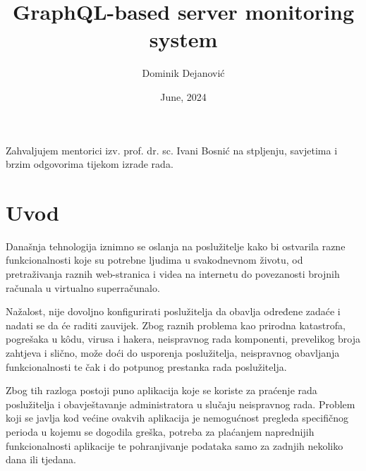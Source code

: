 \documentclass[zavrsnirad]{fer}
\title{GraphQL-based server monitoring system}
\author{Dominik Dejanović}
\date{June, 2024}
\begin{document}
\maketitle






\begin{zahvale}
Zahvaljujem mentorici izv. prof. dr. sc. Ivani Bosnić na stpljenju, savjetima i brzim odgovorima tijekom izrade rada.
\end{zahvale}


\mainmatter


\tableofcontents


\chapter{Uvod}
\label{pog:uvod}
Današnja tehnologija iznimno se oslanja na poslužitelje kako bi ostvarila razne funkcionalnosti koje su potrebne ljudima u svakodnevnom životu, od pretraživanja raznih web-stranica i videa na internetu do povezanosti brojnih računala u virtualno superračunalo. 

Nažalost, nije dovoljno konfigurirati poslužitelja da obavlja određene zadaće i nadati se da će raditi zauvijek. Zbog raznih problema kao prirodna katastrofa, pogrešaka u kôdu, virusa i hakera, neispravnog rada komponenti, prevelikog broja zahtjeva i slično, može doći do usporenja poslužitelja, neispravnog obavljanja funkcionalnosti te čak i do potpunog prestanka rada poslužitelja.

Zbog tih razloga postoji puno aplikacija koje se koriste za praćenje rada poslužitelja i obavještavanje administratora u slučaju neispravnog rada. Problem koji se javlja kod većine ovakvih aplikacija je nemogućnost pregleda specifičnog perioda u kojemu se dogodila greška, potreba za plaćanjem naprednijih funkcionalnosti aplikacije te pohranjivanje podataka samo za zadnjih nekoliko dana ili tjedana.
\end{document}
